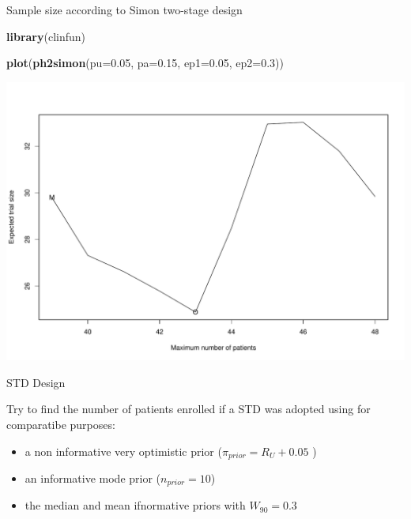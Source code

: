\documentclass{beamer}
\newenvironment{Shaded}{}{}
\newcommand{\KeywordTok}[1]{\textcolor[rgb]{0.00,0.44,0.13}{\textbf{{#1}}}}
\newcommand{\DataTypeTok}[1]{\textcolor[rgb]{0.56,0.13,0.00}{{#1}}}
\newcommand{\FloatTok}[1]{\textcolor[rgb]{0.25,0.63,0.44}{{#1}}}
\newcommand{\NormalTok}[1]{{#1}}
\begin{document}
\begin{frame}[fragile]{Sample size according to Simon two-stage design}

\begin{Shaded}
\begin{Highlighting}[]
\KeywordTok{library}\NormalTok{(clinfun)}

\KeywordTok{plot}\NormalTok{(}\KeywordTok{ph2simon}\NormalTok{(}\DataTypeTok{pu=}\FloatTok{0.05}\NormalTok{, }\DataTypeTok{pa=}\FloatTok{0.15}\NormalTok{, }\DataTypeTok{ep1=}\FloatTok{0.05}\NormalTok{, }\DataTypeTok{ep2=}\FloatTok{0.3}\NormalTok{))}
\end{Highlighting}
\end{Shaded}

\includegraphics[scale=0.4]{06SingleThresholdDesign_files/figure-beamer/unnamed-chunk-9-1.pdf}

\end{frame}

\begin{frame}{STD Design}

Try to find the number of patients enrolled if a STD was adopted using
for comparatibe purposes:

\begin{itemize}
\itemsep1pt\parskip0pt
\item
  a non informative very optimistic prior (\(\pi_{prior}=R_U+0.05\) )
\item
  an informative mode prior (\(n_{prior}=10\))
\item
  the median and mean ifnormative priors with \(W_{90}=0.3\)
\end{itemize}

\end{frame}
\end{document}
